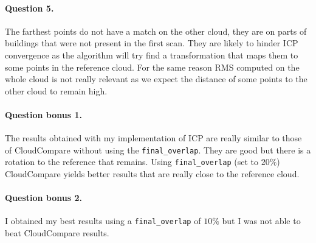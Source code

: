 \documentclass[french]{article}
\begin{document}
\paragraph{Question 5.}
The farthest points do not have a match on the other  cloud, they are on parts of buildings that were not present in the first scan. They are likely to hinder ICP convergence as the algorithm will try find a transformation that maps them to some points in the reference cloud. For the same reason RMS computed on the whole cloud is not really relevant as we expect the distance of some points to the other cloud to remain high.

\paragraph{Question bonus 1.}
The results obtained with my implementation of ICP are really similar to those of CloudCompare without using the \texttt{final\_overlap}. They are good but there is a rotation to the reference that remains. Using \texttt{final\_overlap} (set to $20\%$) CloudCompare yields better results that are really close to the reference cloud.

\paragraph{Question bonus 2.}
I obtained my best results using a \texttt{final\_overlap} of $10\%$ but I was not able to beat CloudCompare results.
\end{document}
